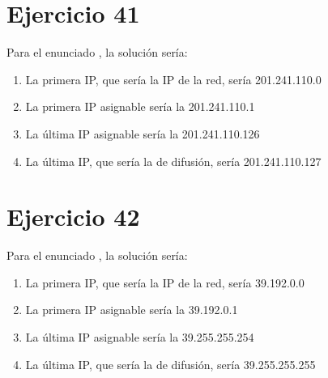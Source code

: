 \documentclass[letterpaper,10pt,spanish]{sphinxmanual}
\begin{document}
\section{Ejercicio 41}
\label{\detokenize{t2_integracion_elementos/ejercicios_subredes_ipv4/rangos_direcciones:id41}}
\sphinxAtStartPar
Para el enunciado , la solución sería:
\begin{enumerate}
%
\item {} 
\sphinxAtStartPar
La primera IP, que sería la IP de la red, sería 201.241.110.0

\item {} 
\sphinxAtStartPar
La primera IP asignable sería la 201.241.110.1

\item {} 
\sphinxAtStartPar
La última IP asignable sería la 201.241.110.126

\item {} 
\sphinxAtStartPar
La última IP, que sería la de difusión, sería 201.241.110.127

\end{enumerate}


\section{Ejercicio 42}
\label{\detokenize{t2_integracion_elementos/ejercicios_subredes_ipv4/rangos_direcciones:id42}}
\sphinxAtStartPar
Para el enunciado , la solución sería:
\begin{enumerate}
%
\item {} 
\sphinxAtStartPar
La primera IP, que sería la IP de la red, sería 39.192.0.0

\item {} 
\sphinxAtStartPar
La primera IP asignable sería la 39.192.0.1

\item {} 
\sphinxAtStartPar
La última IP asignable sería la 39.255.255.254

\item {} 
\sphinxAtStartPar
La última IP, que sería la de difusión, sería 39.255.255.255

\end{enumerate}
\end{document}
